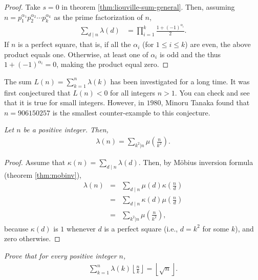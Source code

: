 \documentclass[12pt]{subfile}
\begin{document}
		\begin{proof}
			Take $s=0$ in theorem \ref{thm:liouville-sum-general}. Then, assuming $n= p_1^{\alpha_1} p_2^{\alpha_2} \cdots p_k^{\alpha_k}$ as the prime factorization of $n$,
				\begin{align*}
					\sum_{d\mid n}\lambda(d) &= \prod_{i=1}^{k}\frac{1 + (-1)^{\alpha_i}}{2}.
				\end{align*}
			If $n$ is a perfect square, that is, if all the $\alpha_i$ (for $1 \leq i \leq k$) are even, the above product equals one. Otherwise, at least one of $\alpha_i$ is odd and the thus $1 + (-1)^{\alpha_i}=0$, making the product equal zero.
		\end{proof}

		\begin{remark}
			The sum $L(n)= \sum\limits_{k=1}^{n} \lambda(k)$ has been investigated for a long time. It was first conjectured that $L(n) <0$ for all integers $n >1$. You can check and see that it is true for small integers. However, in $1980$, Minoru Tanaka found that $n=906150257$ is the smallest counter-example to this conjecture.
		\end{remark}
		\begin{theorem}\slshape
			Let $n$ be a positive integer. Then,
				\begin{align*}
					\lambda(n) = \sum_{k^2|n}  \mu \left(\frac{n}{k^2}\right).
				\end{align*}
		\end{theorem}

		\begin{proof}
			Assume that $\displaystyle \kappa(n)=\sum\limits_{d\mid n}\lambda(d)$. Then, by M\"{o}bius inversion formula (theorem \ref{thm:mobinv}),
				\begin{eqnarray*}
					\lambda(n) &=& \sum_{d\mid n}\mu(d)\kappa\left(\frac nd\right)\\
						  &=& \sum_{d\mid n}\kappa(d)\mu\left(\frac nd\right)\\
						  &=& \sum_{k^2|n}  \mu \left(\frac{n}{k^2}\right),
				\end{eqnarray*}
			because $\kappa(d)$ is $1$ whenever $d$ is a perfect square (i.e., $d=k^2$ for some $k$), and zero otherwise.
		\end{proof}

		\begin{theorem}\slshape\label{thm:liouville-square-floor}
			Prove that for every positive integer $n$,
				\begin{align*}
					\sum_{k=1}^{n} \lambda(k) \left\lfloor \frac{n}{k}\right\rfloor = \left\lfloor \sqrt n\right \rfloor.
				\end{align*}
		\end{theorem}
\end{document}
